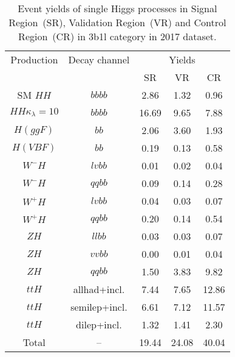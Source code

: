 
\begin{table}[h]
    \centering
    \caption{Event yields of single Higgs processes in Signal Region~(SR), Validation Region~(VR) 
             and Control Region~(CR) in 3b1l category in 2017 dataset.}
    \vspace{1.5mm}
    \begin{tabular}{ccccc}
        \hline
        Production & Decay channel & \multicolumn{3}{c}{Yields} \\
                   &               & SR & VR & CR \\
        \hline
        SM $HH$                & $bbbb$ & 2.86 & 1.32 & 0.96 \\
        $HH \kappa_\lambda=10$ & $bbbb$ & 16.69 & 9.65 & 7.88 \\
        \hline
        $H (ggF)$  & $bb$          & 2.06 & 3.60 & 1.93 \\
        $H (VBF)$  & $bb$          & 0.19 & 0.13 & 0.58 \\
        $W^{-}H$   & $lvbb$        & 0.01 & 0.02 & 0.04 \\
        $W^{-}H$   & $qqbb$        & 0.09 & 0.14 & 0.28 \\
        $W^{+}H$   & $lvbb$        & 0.04 & 0.03 & 0.07 \\
        $W^{+}H$   & $qqbb$        & 0.20 & 0.14 & 0.54 \\
        $ZH$       & $llbb$        & 0.03 & 0.03  & 0.07 \\
        $ZH$       & $vvbb$        & 0.00 & 0.01 & 0.04 \\
        $ZH$       & $qqbb$        & 1.50 & 3.83 & 9.82 \\
        $ttH$      & allhad+incl.  & 7.44 & 7.65 & 12.86 \\
        $ttH$      & semilep+incl. & 6.61 & 7.12 & 11.57 \\
        $ttH$      & dilep+incl.   & 1.32 & 1.41 & 2.30 \\
        \hline
        Total      & --            & 19.44 & 24.08 & 40.04 \\
    \end{tabular}
    \label{tabel:single-higgs-yields-3b1l}
\end{table}
